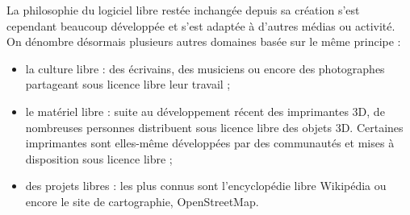 La philosophie du logiciel libre restée inchangée depuis sa création 
s’est cependant beaucoup développée et s’est adaptée à 
d’autres médias ou activité. On dénombre désormais plusieurs 
autres domaines basée sur le même principe :
\begin{itemize}[label=$\bullet$]
\item la \textcolor{Cdl}{culture libre} : des écrivains, des musiciens 
ou encore des photographes partageant sous licence libre leur travail ;
\item le \textcolor{Cdl}{matériel libre} : suite au développement 
récent des imprimantes 3D, de nombreuses personnes distribuent sous 
licence libre des objets 3D. Certaines imprimantes sont elles-même 
développées par des communautés et mises à disposition sous licence 
libre ;
\item des \textcolor{Cdl}{projets libres} : les plus connus sont 
l’encyclopédie libre Wikipédia ou encore le site de cartographie, 
\mbox{OpenStreetMap}.
\end{itemize}
